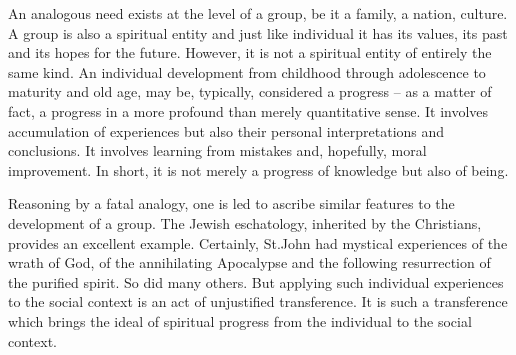 An analogous need exists at the level of a group, be it a family, a nation,
culture. A group is also a spiritual entity and just like individual it has
its values, its past and its hopes for the future. However, it is not a
spiritual entity of entirely the same kind. An individual 
development from childhood through adolescence to maturity and old age, may
be, typically, considered a progress -- as a matter of fact, a progress in a
more profound than merely quantitative sense. It involves accumulation of
experiences but also their personal interpretations and conclusions. It 
involves learning from mistakes and, hopefully, moral improvement. In short,
it is not merely a progress of knowledge but also of being. 

Reasoning by a 
fatal analogy, one is led to ascribe similar features to the development of 
a group.
The Jewish eschatology, inherited by the Christians,  provides an excellent 
example. Certainly,
St.John had mystical experiences of the wrath of God, of the annihilating
Apocalypse and the following resurrection of the purified spirit. So did many
others. But applying such individual experiences to the social context is an
act of unjustified transference. It is such a transference which brings the 
ideal of spiritual progress from the individual to the social context.

